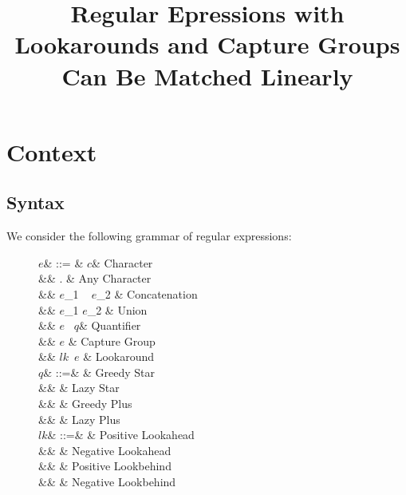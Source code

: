 \documentclass{article}
\title{Regular Epressions with Lookarounds and Capture Groups Can Be Matched Linearly}
\author{}
\date{}
\def\regex#1{\lstinline[style=rgx]{#1}}
\def\tregex#1{\text{\regex{#1}}}
\begin{document}
\maketitle


\section{Context}

\subsection{Syntax}
We consider the following grammar of regular expressions:

\def\re{\ensuremath{\mathit{e}}}
\def\char{\ensuremath{\mathit{c}}}
\def\quant{\ensuremath{\mathit{q}}}
\def\look{\ensuremath{\mathit{lk}}}

\begin{figure}[h]
  \begin{syntax}
\re & ::= & \char & Character \\
&\mid& . & Any Character\\
&\mid& \re_1 ~ \re_2 & Concatenation\\
&\mid& \re_1 \tregex{|} \re_2 & Union\\
&\mid&  \re ~ \quant & Quantifier \\
&\mid&  \tregex{(}\re\tregex{)} & Capture Group \\
&\mid& \tregex{(}\look~\re\tregex{)} & Lookaround \\
%
\quant & ::=& \tregex{*} & Greedy Star\\
&\mid& \tregex{*?} & Lazy Star\\
&\mid& \tregex{+} & Greedy Plus\\
&\mid& \tregex{+?} & Lazy Plus\\
%
\look & ::=& \tregex{?=} & Positive Lookahead\\
&\mid& \tregex{?!} & Negative Lookahead\\
&\mid& \tregex{<=} & Positive Lookbehind\\
&\mid& \tregex{<!} & Negative Lookbehind\\
  \end{syntax}
\end{figure}
\end{document}
